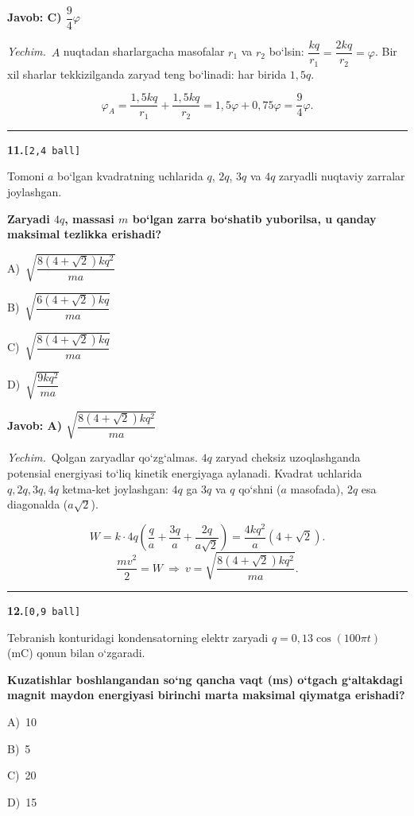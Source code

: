 \documentclass[11pt,a4paper]{article}
\newcommand{\ball}[1]{\hfill\texttt{[#1 ball]}}
\newcommand{\qhead}[2]{\Needspace{10\baselineskip}\noindent\textbf{#1.}\ball{#2}\par\nopagebreak}
\newcommand{\opt}[2]{\hspace*{8mm}#1)\ #2\par}
\newenvironment{qbody}{\begin{list}{}{\leftmargin=8mm\rightmargin=0pt\topsep=0pt\itemsep=0pt\parsep=3pt}\item\relax}{\end{list}}
\begin{document}
\noindent\colorbox{gray!12}{\parbox{\dimexpr\linewidth-2\fboxsep}{\textbf{Javob: C) $\dfrac{9}{4}\varphi$}}}\par\smallskip
\noindent\textit{Yechim.}\ $A$ nuqtadan sharlargacha masofalar $r_1$ va $r_2$ bo‘lsin: $\dfrac{kq}{r_1}=\dfrac{2kq}{r_2}=\varphi$. Bir xil sharlar tekkizilganda zaryad teng bo‘linadi: har birida $1{,}5q$.\par
\[\varphi_A=\frac{1{,}5kq}{r_1}+\frac{1{,}5kq}{r_2}=1{,}5\varphi+0{,}75\varphi=\frac94\varphi.\]\par\medskip\hrule\medskip
\noindent\begin{minipage}{\linewidth}
\qhead{11}{2,4}
\begin{qbody}
Tomoni $a$ bo‘lgan kvadratning uchlarida $q$, $2q$, $3q$ va $4q$ zaryadli nuqtaviy zarralar joylashgan.\par
\textbf{Zaryadi $4q$, massasi $m$ bo‘lgan zarra bo‘shatib yuborilsa, u qanday maksimal tezlikka erishadi?}\par
\smallskip
\opt{A}{$\sqrt{\dfrac{8(4+\sqrt2)kq^2}{ma}}$}
\opt{B}{$\sqrt{\dfrac{6(4+\sqrt2)kq}{ma}}$}
\opt{C}{$\sqrt{\dfrac{8(4+\sqrt2)kq}{ma}}$}
\opt{D}{$\sqrt{\dfrac{9kq^2}{ma}}$}
\end{qbody}\end{minipage}\par\vspace{2pt}
\noindent\colorbox{gray!12}{\parbox{\dimexpr\linewidth-2\fboxsep}{\textbf{Javob: A) $\sqrt{\dfrac{8(4+\sqrt2)kq^2}{ma}}$}}}\par\smallskip
\noindent\textit{Yechim.}\ Qolgan zaryadlar qo‘zg‘almas. $4q$ zaryad cheksiz uzoqlashganda potensial energiyasi to‘liq kinetik energiyaga aylanadi. Kvadrat uchlarida $q,2q,3q,4q$ ketma-ket joylashgan: $4q$ ga $3q$ va $q$ qo‘shni ($a$ masofada), $2q$ esa diagonalda ($a\sqrt2$).\par
\[W=k\cdot4q\left(\frac{q}{a}+\frac{3q}{a}+\frac{2q}{a\sqrt2}\right)=\frac{4kq^2}{a}\left(4+\sqrt2\right).\]
\[\frac{mv^2}{2}=W\ \Rightarrow\ v=\sqrt{\frac{8(4+\sqrt2)kq^2}{ma}}.\]\par\medskip\hrule\medskip
\noindent\begin{minipage}{\linewidth}
\qhead{12}{0,9}
\begin{qbody}
Tebranish konturidagi kondensatorning elektr zaryadi $q=0{,}13\cos(100\pi t)$ (mC) qonun bilan o‘zgaradi.\par
\textbf{Kuzatishlar boshlangandan so‘ng qancha vaqt (ms) o‘tgach g‘altakdagi magnit maydon energiyasi birinchi marta maksimal qiymatga erishadi?}\par
\smallskip
\opt{A}{10}
\opt{B}{5}
\opt{C}{20}
\opt{D}{15}
\end{qbody}\end{minipage}\par\vspace{2pt}
\end{document}

